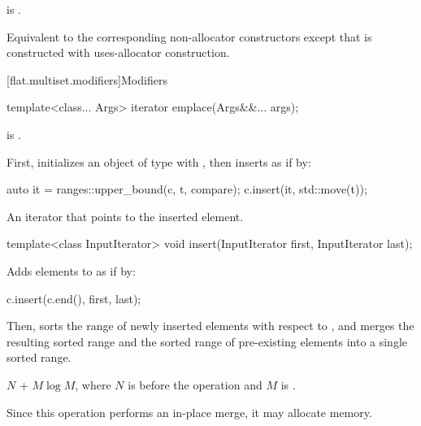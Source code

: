 \begin{itemdescr}
\pnum
\constraints
{} is .

\pnum
\effects
Equivalent to the corresponding non-allocator constructors
except that  is constructed with
uses-allocator construction.
\end{itemdescr}

[flat.multiset.modifiers]{Modifiers}

%
\begin{itemdecl}
template<class... Args> iterator emplace(Args&&... args);
\end{itemdecl}

\begin{itemdescr}
\pnum
\constraints
{} is .

\pnum
\effects
First, initializes an object  of type 
with ,
then inserts  as if by:
\begin{codeblock}
auto it = ranges::upper_bound(c, t, compare);
c.insert(it, std::move(t));
\end{codeblock}

\pnum
\returns
An iterator that points to the inserted element.
\end{itemdescr}

%
\begin{itemdecl}
template<class InputIterator>
  void insert(InputIterator first, InputIterator last);
\end{itemdecl}

\begin{itemdescr}
\pnum
\effects
Adds elements to  as if by:
\begin{codeblock}
c.insert(c.end(), first, last);
\end{codeblock}
Then, sorts the range of newly inserted elements with respect to ,
and merges the resulting sorted range and
the sorted range of pre-existing elements into a single sorted range.

\pnum
\complexity
$N$ + $M \log M$, where $N$ is  before the operation and $M$
is .

\pnum
\remarks
Since this operation performs an in-place merge, it may allocate memory.
\end{itemdescr}

